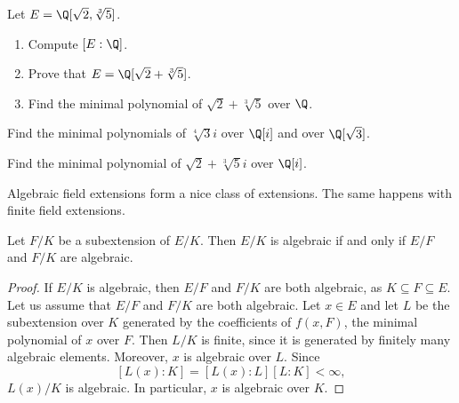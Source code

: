 \begin{exercise}
\label{xca:Q(sqrt2,sqrt[3]5)}
    Let $E=\Q[\sqrt{2},\sqrt[3]{5}]$. 
    \begin{enumerate}
        \item Compute $[E:\Q]$.
        \item Prove that $E=\Q[\sqrt{2}+\sqrt[3]{5}]$.
        \item Find the minimal polynomial of $\sqrt{2}+\sqrt[3]{5}$ over $\Q$. 
    \end{enumerate}
\end{exercise}

\begin{exercise}
\label{xca:isqrt[4]3}
    Find the minimal polynomials of $\sqrt[4]{3}i$ over $\Q[i]$ and over $\Q[\sqrt{3}]$. 
\end{exercise}

\begin{exercise}
\label{xca:sqrt{2}+sqrt[3]{5}i}
    Find the minimal polynomial of $\sqrt{2}+\sqrt[3]{5}i$ over $\Q[i]$.
\end{exercise}

%
%
%
Algebraic field extensions form a nice class of extensions. The same happens
with finite field extensions. 

\begin{proposition}
	Let $F/K$ be a subextension of $E/K$. Then $E/K$ is algebraic 
	if and only if $E/F$ and $F/K$ are algebraic. 
\end{proposition}

\begin{proof}
    If $E/K$ is algebraic, then $E/F$ and $F/K$ are both algebraic, 
    as $K\subseteq F\subseteq E$. 
    Let us assume that $E/F$ and $F/K$ are both algebraic. Let $x\in E$ and 
    let $L$ be the subextension over $K$ generated by the coefficients of $f(x,F)$, 
    the minimal polynomial of $x$ over $F$. Then $L/K$ is finite, since it is generated
    by finitely many algebraic elements. Moreover, $x$ is algebraic over $L$. Since 
    \[
    [L(x):K]=[L(x):L][L:K]<\infty,
    \]
    $L(x)/K$ is algebraic. In particular, $x$ is algebraic over $K$. 
\end{proof}


